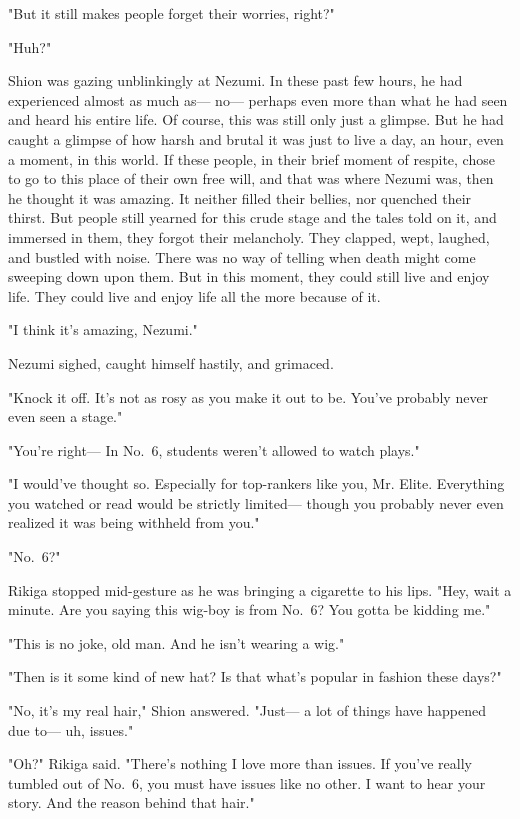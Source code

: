 "But it still makes people forget their worries, right?"

"Huh?"

Shion was gazing unblinkingly at Nezumi. In these past few hours, he had
experienced almost as much as--- no--- perhaps even more than what he had
seen and heard his entire life. Of course, this was still only just a
glimpse. But he had caught a glimpse of how harsh and brutal it was just
to live a day, an hour, even a moment, in this world. If these people,
in their brief moment of respite, chose to go to this place of their own
free will, and that was where Nezumi was, then he thought it was
amazing. It neither filled their bellies, nor quenched their thirst. But
people still yearned for this crude stage and the tales told on it, and
immersed in them, they forgot their melancholy. They clapped, wept,
laughed, and bustled with noise. There was no way of telling when death
might come sweeping down upon them. But in this moment, they could still
live and enjoy life. They could live and enjoy life all the more because
of it.

"I think it's amazing, Nezumi."

Nezumi sighed, caught himself hastily, and grimaced.

"Knock it off. It's not as rosy as you make it out to be. You've
probably never even seen a stage."

"You're right--- In No.~6, students weren't allowed to watch plays."

"I would've thought so. Especially for top-rankers like you, Mr. Elite.
Everything you watched or read would be strictly limited--- though you
probably never even realized it was being withheld from you."

"No.~6?"

Rikiga stopped mid-gesture as he was bringing a cigarette to his lips.
"Hey, wait a minute. Are you saying this wig-boy is from No.~6? You
gotta be kidding me."

"This is no joke, old man. And he isn't wearing a wig."

"Then is it some kind of new hat? Is that what's popular in fashion
these days?"

"No, it's my real hair," Shion answered. "Just--- a lot of things have
happened due to--- uh, issues."

"Oh?" Rikiga said. "There's nothing I love more than issues. If you've
really tumbled out of No.~6, you must have issues like no other. I want
to hear your story. And the reason behind that hair."

